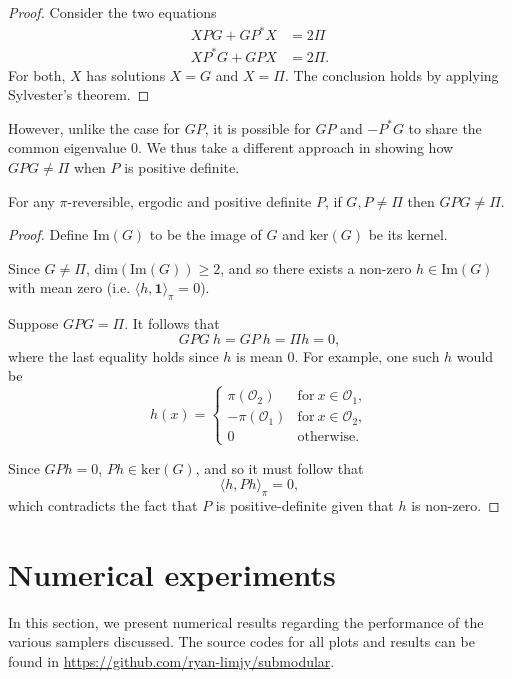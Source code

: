 \documentclass[EJP]{ejpecp} %
\begin{document}
\begin{proof}
    Consider the two equations 
    \begin{align*}
        XPG + GP^*X &= 2\Pi\\
        XP^*G + GPX &= 2\Pi.
    \end{align*}
    For both, $X$ has solutions $X = G$ and $X = \Pi$. The conclusion holds by applying Sylvester's theorem.
\end{proof}

However, unlike the case for $GP$, it is possible for $GP$ and $-P^*G$ to share the common eigenvalue $0$. We thus take a different approach in showing how $GPG \neq \Pi$ when $P$ is positive definite. 

\begin{proposition}
    For any $\pi$-reversible, ergodic and positive definite $P$, if $G, P \neq \Pi$ then $GPG \neq \Pi.$
\end{proposition}

\begin{proof}
    Define $\mathrm{Im}(G)$ to be the image of $G$ and $\mathrm{ker}(G)$ be its kernel. 
    
    Since $G \neq \Pi$, $\mathrm{dim}(\mathrm{Im}(G)) \geq 2$, and so there exists a non-zero $h \in \mathrm{Im}(G)$ with mean zero (i.e. $\langle h, \mathbf{1}\rangle_\pi = 0$).

    Suppose $GPG = \Pi$. It follows that 
    $$GPG\ h = GP\ h = \Pi h = 0,$$
    where the last equality holds since $h$ is mean 0. For example, one such $h$ would be 
    $$h(x) = \begin{cases}
        \pi(\mathcal{O}_2) & \mathrm{for}\ x \in \mathcal{O}_1,\\
        -\pi(\mathcal{O}_1) & \mathrm{for}\ x \in \mathcal{O}_2,\\
        0 & \mathrm{otherwise}.
    \end{cases}$$

    Since $GPh = 0$, $Ph \in \mathrm{ker}(G)$, and so it must follow that 
    $$\langle h, Ph \rangle_\pi = 0,$$
    which contradicts the fact that $P$ is positive-definite given that $h$ is non-zero.
\end{proof}

\section{Numerical experiments} \label{sec:num}
In this section, we present numerical results regarding the performance of the various samplers discussed. The source codes for all plots and results can be found in \url{https://github.com/ryan-limjy/submodular}.
\end{document}
